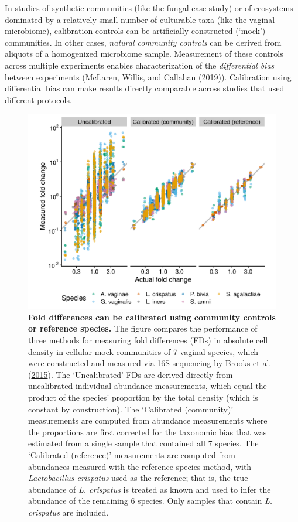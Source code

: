 \documentclass[
]{article}
\begin{document}
In studies of synthetic communities (like the fungal case study) or of ecosystems dominated by a relatively small number of culturable taxa (like the vaginal microbiome), calibration controls can be artificially constructed (`mock') communities.
In other cases, \emph{natural community controls} can be derived from aliquots of a homogenized microbiome sample.
Measurement of these controls across multiple experiments enables characterization of the \emph{differential bias} between experiments (McLaren, Willis, and Callahan (\protect\hyperlink{ref-mclaren2019cons}{2019})).
Calibration using differential bias can make results directly comparable across studies that used different protocols.

\begin{figure}
\includegraphics[width=1\linewidth]{notebook/_posts/2021-10-25-brooks2015thet-calibration/brooks2015thet-calibration_files/figure-html5/brooks2015thet_fc_calibration-1} \caption{\textbf{Fold differences can be calibrated using community controls or reference species.} The figure compares the performance of three methods for measuring fold differences (FDs) in absolute cell density in cellular mock communities of 7 vaginal species, which were constructed and measured via 16S sequencing by Brooks et al. (\protect\hyperlink{ref-brooks2015thet}{2015}). The `Uncalibrated' FDs are derived directly from uncalibrated individual abundance measurements, which equal the product of the species' proportion by the total density (which is constant by construction). The `Calibrated (community)' measurements are computed from abundance measurements where the proportions are first corrected for the taxonomic bias that was estimated from a single sample that contained all 7 species. The `Calibrated (reference)' measurements are computed from abundances measured with the reference-species method, with \emph{Lactobacillus crispatus} used as the reference; that is, the true abundance of \emph{L. crispatus} is treated as known and used to infer the abundance of the remaining 6 species. Only samples that contain \emph{L. crispatus} are included.}\label{fig:calibration-example}
\end{figure}
\end{document}
